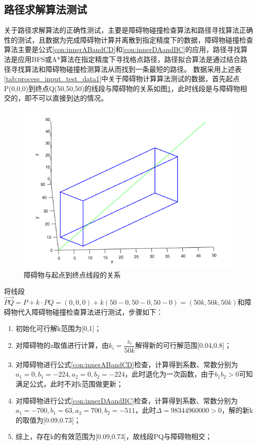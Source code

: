 \subsection{路径求解算法测试}
\par 关于路径求解算法的正确性测试，主要是障碍物碰撞检查算法和路径寻找算法正确性的测试，且数据为完成障碍物计算并离散到指定精度下的数据，障碍物碰撞检查算法主要是公式\ref{con:innerABandCD}和\ref{con:innerDAandBC}的应用，路径寻找算法是应用BFS或A*算法在指定精度下寻找格点路径，路径拟合算法是通过结合路径寻找算法和障碍物碰撞检测算法从而找到一条最短的路径。
数据采用上述表\ref{tab:process_input_test_data1}中关于障碍物计算算法测试的数据，首先起点P(0,0,0)到终点Q(50,50,50)的线段与障碍物的关系如图\ref{fig:insect_ex_insected}，此时线段是与障碍物相交的，即不可以直接到达的情况。
\begin{figure}[!htb]
    \centering
    \includegraphics[width=12cm]{figures/insect_ex_insected.png}
    \caption{障碍物与起点到终点线段的关系}
    \label{fig:insect_ex_insected}
\end{figure}
将线段$\vec{PQ}=P+k\cdot PQ=(0,0,0)+k(50-0,50-0,50-0)=(50k,50k,50k)$和障碍物代入障碍物碰撞检查算法进行测试，步骤如下：
\begin{enumerate}
    \item 初始化可行解k范围为[0,1]；
    \item 对障碍物的z取值进行计算，由$k_i=\dfrac{z_i}{50k}$解得新的可行解范围[0.04,0.8]；
    \item 对障碍物进行公式\ref{con:innerABandCD}检查，计算得到系数、常数分别为$a_1=0,b_1=-224,a_2=0,b_2=-224$，此时退化为一次函数，由于$b_1b_2>0$可知满足公式，此时不对k范围做更新；
    \item 对障碍物进行公式\ref{con:innerDAandBC}检查，计算得到系数、常数分别为$a_1=-700,b_1=63,a_2=700,b_2=-511$，此时$\Delta=98344960000>0$，解的新k的取值为[0.09,0.73]；
    \item 综上，存在k的有效范围为[0.09,0.73]，故线段PQ与障碍物相交；
\end{enumerate}

